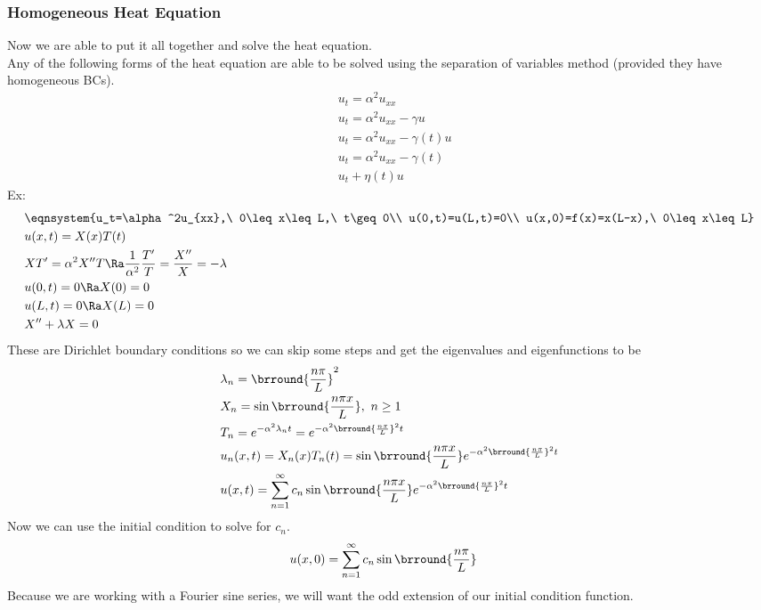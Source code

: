 \subsubsection{Homogeneous Heat Equation}
Now we are able to put it all together and solve the heat equation.\\
Any of the following forms of the heat equation are able to be solved using the separation of variables method (provided they have homogeneous BCs).
\begin{align*}
    &u_{t}=\alpha^2u_{xx}\\
    &u_{t}=\alpha^2u_{xx}-\gamma u\\
    &u_{t}=\alpha^2u_{xx}-\gamma(t)u\\
    &u_{t}=\alpha^2u_{xx}-\gamma(t)\\ &u_t+\eta(t)u
\end{align*}
Ex:
\begin{align*}
    &\eqnsystem{u_t=\alpha^2u_{xx},\ 0\leq x\leq L,\ t\geq 0\\ u(0,t)=u(L,t)=0\\ u(x,0)=f(x)=x(L-x),\ 0\leq x\leq L}\\
    &u(x,t)=X(x)T(t)\\
    &XT'=\alpha^2 X''T\Ra \frac{1}{\alpha^2}\frac{T'}{T}=\frac{X''}{X}=-\lambda\\
    &u(0,t)=0\Ra X(0)=0\\
    &u(L,t)=0\Ra X(L)=0\\
    &X''+\lambda X=0
\end{align*}
These are Dirichlet boundary conditions so we can skip some steps and get the eigenvalues and eigenfunctions to be
\begin{align*}
    &\lambda_n=\brround{\frac{n\pi }{L}}^2\\
    &X_n=\sin\brround{\frac{n\pi x}{L}},\ n\geq 1\\
    &T_n=e^{-\alpha^2\lambda_n t}=e^{-\alpha^2\brround{\frac{n\pi}{L}}^2t}\\
    &u_n(x,t)=X_n(x)T_n(t)=\sin\brround{\frac{n\pi x}{L}}e^{-\alpha^2\brround{\frac{n\pi}{L}}^2t}\\
    &u(x,t)=\sum_{n=1}^\infty c_n\sin\brround{\frac{n\pi x}{L}}e^{-\alpha^2\brround{\frac{n\pi}{L}}^2t}
\end{align*}
Now we can use the  initial condition to solve for $c_n$.
\begin{align*}
    &u(x,0)=\sum_{n=1}^\infty c_n\sin\brround{\frac{n\pi}{L}}
\end{align*}
Because we are working with a Fourier sine series, we will want the odd extension of our initial condition function.
